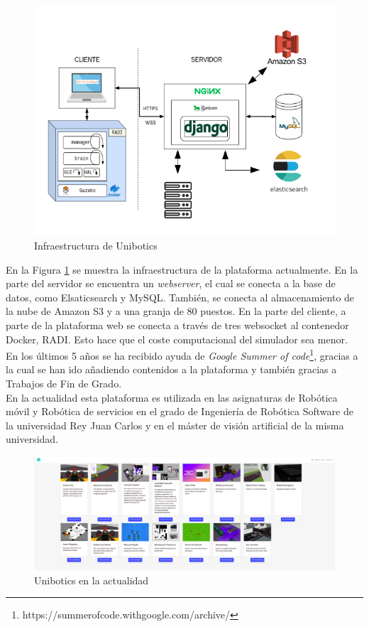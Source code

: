 \begin{figure}[H]
    \centering
    \includegraphics[width=13cm, keepaspectratio]{img/infraestructura.png}
    \caption{Infraestructura de Unibotics}
    \label{fig:infra}
\end{figure}
\newpage
En la Figura \ref{fig:infra} se muestra la infraestructura de la plataforma actualmente. En la parte del servidor se encuentra un \textit{webserver}, el cual se conecta a la base de datos, como Elsaticsearch y MySQL. También, se conecta al almacenamiento de la nube de Amazon S3 y a una granja de 80 puestos. En la parte del cliente, a parte de la plataforma web se conecta a través de tres websocket al contenedor Docker, RADI. Esto hace que el coste computacional del simulador sea menor.\\

En los últimos 5 años se ha recibido ayuda de \textit{Google Summer of code}\footnote{https://summerofcode.withgoogle.com/archive/}, gracias a la cual se han ido añadiendo contenidos a la plataforma y también gracias a Trabajos de Fin de Grado.\\

En la actualidad esta plataforma es utilizada en las asignaturas de Robótica móvil y Robótica de servicios en el grado de Ingeniería de Robótica Software de la universidad Rey Juan Carlos y en el máster de visión artificial de la misma universidad.

\begin{figure}[H]
    \centering
    \includegraphics[width=15cm, keepaspectratio]{img/unibotics.png}
    \caption{Unibotics en la actualidad}
    \label{fig:unibotics}
\end{figure}

